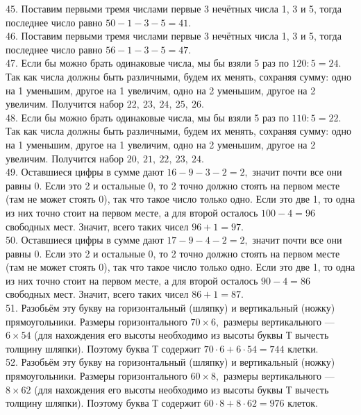 \begin{center}
\begin{figure}[ht!]
\end{figure}
\end{center}
45. Поставим первыми тремя числами первые 3 нечётных числа 1, 3 и 5, тогда последнее число равно $50-1-3-5=41.$\\
46. Поставим первыми тремя числами первые 3 нечётных числа 1, 3 и 5, тогда последнее число равно $56-1-3-5=47.$\\
47. Если бы можно брать одинаковые числа, мы бы взяли 5 раз по $120:5=24.$ Так как числа должны быть различными, будем их менять, сохраняя сумму: одно на 1 уменьшим, другое на 1 увеличим, одно на 2 уменьшим, другое на 2 увеличим. Получится набор $22,\ 23,\ 24,\ 25,\ 26.$\\
48. Если бы можно брать одинаковые числа, мы бы взяли 5 раз по $110:5=22.$ Так как числа должны быть различными, будем их менять, сохраняя сумму: одно на 1 уменьшим, другое на 1 увеличим, одно на 2 уменьшим, другое на 2 увеличим. Получится набор $20,\ 21,\ 22,\ 23,\ 24.$\\
49. Оставшиеся цифры в сумме дают $16-9-3-2=2,$ значит почти все они равны 0. Если это 2 и остальные 0, то 2 точно должно стоять на первом месте (там не может стоять 0), так что такое число только одно. Если это две 1, то одна из них точно стоит на первом месте, а для второй осталось $100-4=96$ свободных мест. Значит, всего таких чисел $96+1=97.$\\
50. Оставшиеся цифры в сумме дают $17-9-4-2=2,$ значит почти все они равны 0. Если это 2 и остальные 0, то 2 точно должно стоять на первом месте (там не может стоять 0), так что такое число только одно. Если это две 1, то одна из них точно стоит на первом месте, а для второй осталось $90-4=86$ свободных мест. Значит, всего таких чисел $86+1=87.$\\
51. Разобьём эту букву на горизонтальный (шляпку) и вертикальный (ножку) прямоугольники. Размеры горизонтального $70\times6,$ размеры вертикального --- $6\times54$ (для нахождения его высоты необходимо из высоты буквы Т вычесть толщину шляпки). Поэтому буква Т содержит $70\cdot6+6\cdot54=744$ клетки.\\
52. Разобьём эту букву на горизонтальный (шляпку) и вертикальный (ножку) прямоугольники. Размеры горизонтального $60\times8,$ размеры вертикального --- $8\times62$ (для нахождения его высоты необходимо из высоты буквы Т вычесть толщину шляпки). Поэтому буква Т содержит $60\cdot8+8\cdot62=976$ клеток.\\
